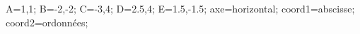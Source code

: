 \documentclass[exercice]{thedocument}%
\begin{document}
%
\>A={1,1};%
\>B={-2,-2};%
\>C={-3,4};%
\>D={2.5,4};%
\>E={1.5,-1.5};%
\>axe=horizontal;%
\>coord1=abscisse;%
\>coord2=ordonnées;%
%
\end{document}

